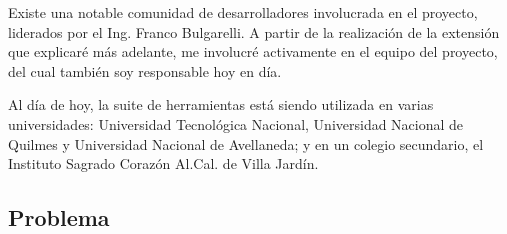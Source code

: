 Existe una notable comunidad de desarrolladores involucrada en el proyecto, liderados por el Ing. Franco Bulgarelli. A partir de la realización de la extensión que explicaré más adelante, me involucré activamente en el equipo del proyecto, del cual también soy responsable hoy en día.

Al día de hoy, la suite de herramientas está siendo utilizada en varias universidades: Universidad Tecnológica Nacional, Universidad Nacional de Quilmes y Universidad Nacional de Avellaneda; y en un colegio secundario, el Instituto Sagrado Corazón Al.Cal. de Villa Jardín.

\subsection{Problema}
